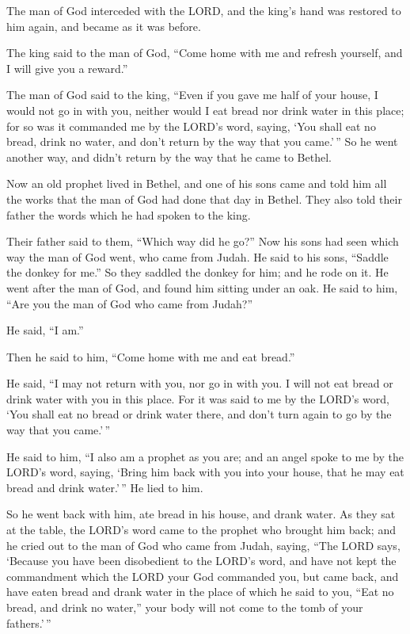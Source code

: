 The man of God interceded with the LORD, and the king's hand was
restored to him again, and became as it was before.

 The king said to the man of God, ``Come home with me and
refresh yourself, and I will give you a reward.''

 The man of God said to the king, ``Even if you gave me
half of your house, I would not go in with you, neither would I eat
bread nor drink water in this place;  for so was it
commanded me by the LORD's word, saying, `You shall eat no bread, drink
no water, and don't return by the way that you came.'\,''
 So he went another way, and didn't return by the way
that he came to Bethel.

 Now an old prophet lived in Bethel, and one of his sons
came and told him all the works that the man of God had done that day in
Bethel. They also told their father the words which he had spoken to the
king.

 Their father said to them, ``Which way did he go?'' Now
his sons had seen which way the man of God went, who came from Judah.
 He said to his sons, ``Saddle the donkey for me.'' So
they saddled the donkey for him; and he rode on it.  He
went after the man of God, and found him sitting under an oak. He said
to him, ``Are you the man of God who came from Judah?''

He said, ``I am.''

 Then he said to him, ``Come home with me and eat
bread.''

 He said, ``I may not return with you, nor go in with
you. I will not eat bread or drink water with you in this place.
 For it was said to me by the LORD's word, `You shall eat
no bread or drink water there, and don't turn again to go by the way
that you came.'\,''

 He said to him, ``I also am a prophet as you are; and an
angel spoke to me by the LORD's word, saying, `Bring him back with you
into your house, that he may eat bread and drink water.'\,'' He lied to
him.

 So he went back with him, ate bread in his house, and
drank water.  As they sat at the table, the LORD's word
came to the prophet who brought him back;  and he cried
out to the man of God who came from Judah, saying, ``The LORD says,
`Because you have been disobedient to the LORD's word, and have not kept
the commandment which the LORD your God commanded you, 
but came back, and have eaten bread and drank water in the place of
which he said to you, ``Eat no bread, and drink no water,'' your body
will not come to the tomb of your fathers.'\,''

